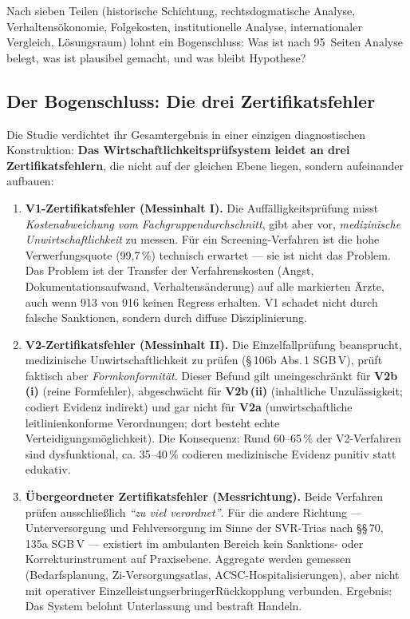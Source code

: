 \documentclass{umbruch-position}
\begin{document}
Nach sieben Teilen (historische Schichtung, rechtsdogmatische Analyse, Verhaltensökonomie, Folgekosten, institutionelle Analyse, internationaler Vergleich, Lösungsraum) lohnt ein Bogenschluss: Was ist nach 95~Seiten Analyse belegt, was ist plausibel gemacht, und was bleibt Hypothese?

\subsection{Der Bogenschluss: Die drei Zertifikatsfehler}

Die Studie verdichtet ihr Gesamtergebnis in einer einzigen diagnostischen Konstruktion: \textbf{Das Wirtschaftlichkeitsprüfsystem leidet an drei Zertifikatsfehlern}, die nicht auf der gleichen Ebene liegen, sondern aufeinander aufbauen:

\begin{enumerate}
  \item \textbf{V1-Zertifikatsfehler (Messinhalt I).} Die Auffälligkeits\-prüfung misst \emph{Kostenabweichung vom Fachgruppen\-durchschnitt}, gibt aber vor, \emph{medizinische Unwirtschaftlichkeit} zu messen. Für ein Screening-Verfahren ist die hohe Verwerfungsquote (99,7\,\%) technisch erwartet --- sie ist nicht das Problem. Das Problem ist der Transfer der Verfahrens\-kosten (Angst, Dokumentations\-aufwand, Verhaltens\-änderung) auf alle markierten Ärzte, auch wenn 913 von 916 keinen Regress erhalten. V1 schadet nicht durch falsche Sanktionen, sondern durch diffuse Disziplinierung.
  \item \textbf{V2-Zertifikatsfehler (Messinhalt II).} Die Einzelfall\-prüfung beansprucht, medizinische Unwirtschaftlichkeit zu prüfen (\S\,106b Abs.\,1 SGB\,V), prüft faktisch aber \emph{Formkonformität}. Dieser Befund gilt uneingeschränkt für \textbf{V2b\,(i)} (reine Formfehler), abgeschwächt für \textbf{V2b\,(ii)} (inhaltliche Unzulässigkeit; codiert Evidenz indirekt) und gar nicht für \textbf{V2a} (unwirtschaftliche leitlinienkonforme Verordnungen; dort besteht echte Verteidigungsmöglichkeit). Die Konsequenz: Rund 60--65\,\% der V2-Verfahren sind dysfunktional, ca. 35--40\,\% codieren medizinische Evidenz punitiv statt edukativ.
  \item \textbf{Übergeordneter Zertifikatsfehler (Messrichtung).} Beide Verfahren prüfen ausschließlich \emph{``zu viel verordnet''}. Für die andere Richtung --- Unterversorgung und Fehlversorgung im Sinne der SVR-Trias nach \S\S\,70, 135a SGB\,V --- existiert im ambulanten Bereich kein Sanktions- oder Korrekturinstrument auf Praxis\-ebene. Aggregate werden gemessen (Bedarfsplanung, Zi-Versorgungsatlas, ACSC-Hospitalisierungen), aber nicht mit operativer Einzel\-leistungs\-erbringer\-Rückkopplung verbunden. Ergebnis: Das System belohnt Unterlassung und bestraft Handeln.
\end{enumerate}
\end{document}
